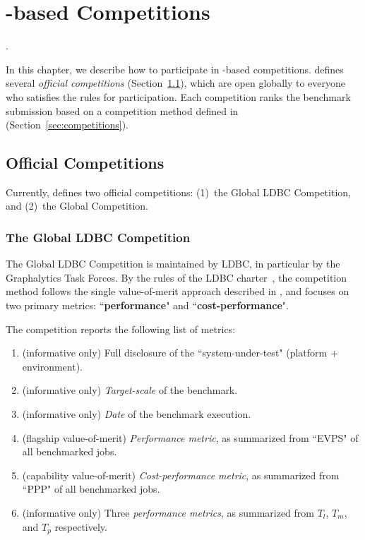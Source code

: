 \chapter{\toolname-based Competitions} \label{chap:competitions}

 .

In this chapter, we describe how to participate in \toolname-based competitions. 
\toolname{} defines several {\it official competitions} (Section~\ref{sec:competitions:overview}), which are open globally to everyone who satisfies the rules for participation. Each competition ranks the benchmark submission based on a competition method defined in (Section~\ref{sec:competitions}).




\section{Official \toolname{} Competitions}
\label{sec:competitions:overview}
Currently, \toolname{} defines two official competitions: (1)~the Global LDBC Competition, and (2)~the Global \toolname{} Competition.


\subsection{The Global LDBC Competition} \label{sec:competitions:ldbc}
The Global LDBC Competition is maintained by LDBC, in particular by the Graphalytics Task Forces. By the rules of the LDBC charter~\cite{ldbc_byelaws}, the competition method follows the single value-of-merit approach described in , and focuses on two primary metrics: ``{\bf performance}" and ``{\bf cost-performance}".

The competition reports the following list of metrics:
\begin{enumerate}
    \item (informative only) Full disclosure of the ``system-under-test" (platform + environment).
    \item (informative only) {\it Target-scale} of the benchmark.
    \item (informative only) {\it Date} of the benchmark execution.
	\item (flagship value-of-merit) {\it Performance metric}, as summarized from ``EVPS" of all benchmarked jobs.
	\item (capability value-of-merit) {\it Cost-performance metric}, as summarized from ``PPP" of all benchmarked jobs.
	\item (informative only) Three {\it performance metrics}, as summarized from $T_l$, $T_m$, and $T_p$ respectively.
\end{enumerate}

